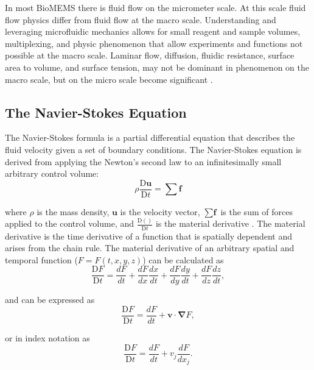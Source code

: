 \par In most BioMEMS there is fluid flow on the micrometer scale. At this scale fluid flow physics differ from fluid flow at the macro scale. Understanding and leveraging microfluidic mechanics allows for small reagent and sample volumes, multiplexing, and physic phenomenon that allow experiments and functions not possible at the macro scale. Laminar flow, diffusion, fluidic resistance, surface area to volume, and surface tension, may not be dominant in phenomenon on the macro scale, but on the micro scale become significant \cite{david_j._beebe_physics_2002}. 

\subsection*{The Navier-Stokes Equation}

\par The Navier-Stokes formula is a partial differential equation that describes the fluid velocity given a set of boundary conditions. The Navier-Stokes equation is derived from applying the Newton's second law to an infinitesimally small arbitrary control volume:
\begin{equation}
    \rho \frac{\text{D}\textbf{u}}{\text{D}t} = \sum \textbf{f}
    \label{eqn:cons_momentum}
\end{equation}

\noindent where $\rho$ is the mass density, $\textbf{u}$ is the velocity vector, $\sum \textbf{f}$ is the sum of forces applied to the control volume, and $\frac{\text{D}()}{\text{D}t}$ is the material derivative \cite{probstein_physicochemical_2005}. The material derivative is the time derivative of a function that is spatially dependent and arises from the chain rule. The material derivative of an arbitrary spatial and temporal function ($F = F(t,x,y,z)$) can be calculated as
\begin{equation}
    \frac{\text{D}F}{\text{D}t} = \frac{dF}{dt} + \frac{dF}{dx}\frac{dx}{dt} + \frac{dF}{dy}\frac{dy}{dt} + \frac{dF}{dz}\frac{dz}{dt},
\end{equation}

and can be expressed as 
\begin{equation}
    \frac{\text{D}F}{\text{D}t} = \frac{dF}{dt} + \textbf{v} \cdot \boldsymbol{\nabla}F,
\end{equation}

or in index notation as
\begin{equation}
    \frac{\text{D}F}{\text{D}t} = \frac{dF}{dt} + v_j\frac{dF}{dx_j}.
\end{equation}

